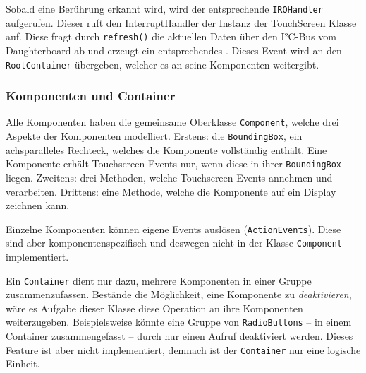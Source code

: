 		Sobald eine Berührung erkannt wird, wird der entsprechende \texttt{IRQHandler} aufgerufen.
		Dieser ruft den InterruptHandler der Instanz der TouchScreen Klasse auf.
		Diese fragt durch \texttt{refresh()} die aktuellen Daten über den I²C-Bus vom Daughterboard ab und erzeugt ein entsprechendes .
		Dieses Event wird an den \texttt{RootContainer} übergeben, welcher es an seine Komponenten weitergibt.
	
	\subsubsection{Komponenten und Container}\label{sec:components}
		\begin{figure}
			\scalebox{0.75}{
				\begin{tikzpicture}
					
				\end{tikzpicture}
			}
			\label{uml-component}
		\end{figure}
		Alle Komponenten haben die gemeinsame Oberklasse \texttt{Component}, welche drei Aspekte der Komponenten modelliert. Erstens: die \texttt{BoundingBox}, ein achsparalleles Rechteck, welches die Komponente vollständig enthält.
		Eine Komponente erhält Touchscreen-Events nur, wenn diese in ihrer \texttt{BoundingBox} liegen.
		Zweitens: drei Methoden, welche Touchscreen-Events annehmen und verarbeiten.
		Drittens: eine Methode, welche die Komponente auf ein Display zeichnen kann.
		
		Einzelne Komponenten können eigene Events auslösen (\texttt{ActionEvents}).
		Diese sind aber komponentenspezifisch und deswegen nicht in der Klasse \texttt{Component} implementiert.
		
		\medskip
		\begin{figure}
			\label{uml-container}
		\end{figure}
		Ein \texttt{Container} dient nur dazu, mehrere Komponenten in einer Gruppe zusammenzufassen.
		Bestände die Möglichkeit, eine Komponente zu \emph{deaktivieren}, wäre es Aufgabe dieser Klasse diese Operation an ihre Komponenten weiterzugeben.
		Beispielsweise könnte eine Gruppe von \texttt{RadioButtons} -- in einem Container zusammengefasst -- durch nur einen Aufruf deaktiviert werden.
		Dieses Feature ist aber nicht implementiert, demnach ist der \texttt{Container} nur eine logische Einheit.
		
